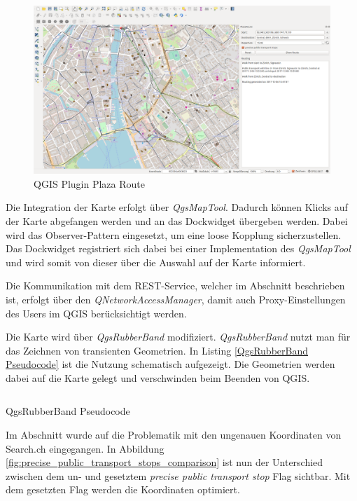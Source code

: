 \begin{figure}[ht]
\centering
\includegraphics[width=1.0\linewidth]{projectdoc/img/qgis_plugin_plaza_route}
\caption[QGIS Plugin Plaza Route]{QGIS Plugin Plaza Route}
\label{fig:qgis_plugin_plaza_route}
\end{figure}

Die Integration der Karte erfolgt über \emph{QgsMapTool}. Dadurch können Klicks auf der Karte abgefangen werden und an das Dockwidget übergeben werden. Dabei wird das Observer-Pattern eingesetzt, um eine loose Kopplung sicherzustellen. Das Dockwidget registriert sich dabei bei einer Implementation des \emph{QgsMapTool} und wird somit von dieser über die Auswahl auf der Karte informiert.

Die Kommunikation mit dem \ac{REST}-Service, welcher im Abschnitt  beschrieben ist, erfolgt über den \emph{QNetworkAccessManager}, damit auch Proxy-Einstellungen des Users im QGIS berücksichtigt werden.

Die Karte wird über \emph{QgsRubberBand} modifiziert. \emph{QgsRubberBand} nutzt man für das Zeichnen von transienten Geometrien. In Listing \ref{QgsRubberBand Pseudocode} ist die Nutzung schematisch aufgezeigt. Die Geometrien werden dabei auf die Karte gelegt und verschwinden beim Beenden von QGIS.

\begin{listing}[ht]
    \inputminted{python}{projectdoc/listing/rubber_band.py}
    \caption{QgsRubberBand Pseudocode}
    \label{QgsRubberBand Pseudocode}
\end{listing}

Im Abschnitt  wurde auf die Problematik mit den ungenauen Koordinaten von Search.ch \cite{search_ch_route_api} eingegangen. In Abbildung \ref{fig:precise_public_transport_stops_comparison} ist nun der Unterschied zwischen dem un- und gesetztem \emph{precise public transport stop} Flag sichtbar. Mit dem gesetzten Flag werden die Koordinaten optimiert.


